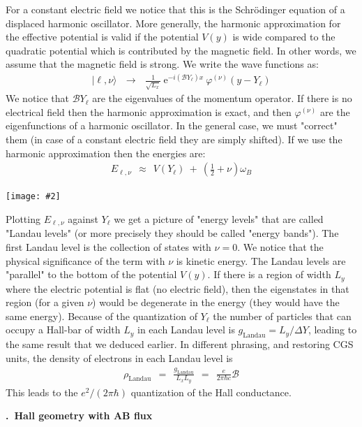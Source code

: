 \documentclass[onecolumn,fleqn, 11pt]{revtex4}
\newcommand{\eexp}{\mathrm{e}^}
\newcommand{\putgraph}[2][0.30\hsize]{\texttt{[image: \#2]}}
\newcommand{\beq}{\begin{eqnarray}}
\newcommand{\eeq}{\end{eqnarray}}
\renewcommand{\thesubsection}{\arabic{subsection}}
\renewcommand{\thesubsubsection}{\arabic{subsubsection}}
\newcommand{\sheadC}[1]
{
\addtocounter{subsubsection}{1}
\vspace{5mm}
{\bf \thesubsection.\thesubsubsection \ #1}  
\nopagebreak
\phantomsection
}
\begin{document}
For a constant electric field we notice that this 
is the Schr\"{o}dinger equation of a displaced 
harmonic oscillator. More generally, the harmonic 
approximation for the effective potential is 
valid if the potential ${V(y)}$ is wide compared 
to the quadratic potential which is contributed 
by the magnetic field. In other words, we assume that 
the magnetic field is strong. We write the wave functions as:
\beq
|\ell,\nu \rangle 
\ \ \ \rightarrow \ \ \ 
\frac{1}{\sqrt{L_x}} \  
\eexp{-i (\mathcal{B}Y_{\ell}) x } \  
\varphi^{(\nu)}(y-Y_{\ell}) 
\eeq
We notice that ${\mathcal{B}Y_{\ell}}$ are 
the eigenvalues of the momentum operator. 
If there is no electrical field then 
the harmonic approximation is exact, 
and then ${\varphi^{(\nu)}}$ are the 
eigenfunctions of a harmonic oscillator. 
In the general case, we must "correct" them
(in case of a constant electric field 
they are simply shifted). 
If we use the harmonic approximation 
then the energies are:
\beq
E_{\ell,\nu} \ \ \approx \ \ V( Y_{\ell} ) \ + \ \left( \frac{1}{2} + \nu \right) \omega_B 
\eeq




\begin{center}
\putgraph[0.6\hsize]{LandauLevels} 
\end{center}


Plotting $E_{\ell,\nu}$ against $Y_{\ell}$ 
we get a picture of "energy levels" that 
are called "Landau levels" (or more precisely they 
should be called "energy bands"). 
The first Landau level is the collection of states with ${\nu=0}$. 
We notice that the physical significance of the term 
with ${\nu}$ is kinetic energy. The Landau levels 
are "parallel" to the bottom of the potential ${V(y)}$. 
If there is a region of width ${L_y}$ where the electric potential 
is flat (no electric field), then the eigenstates 
in that region (for a given ${\nu}$) would be degenerate 
in the energy (they would have the same energy). 
Because of the quantization of $Y_{\ell}$  
the number of particles that can occupy a Hall-bar of 
width ${ L_y }$ in each Landau level 
is $g_{\text{Landau}}=L_y/\Delta Y$, 
leading to the same result that we deduced earlier.   
In different phrasing, and restoring CGS units, 
the density of electrons in each Landau level is 
\beq
\rho_{\text{Landau}} \ \ = \ \ \frac{g_{\text{Landau}}}{L_xL_y}
\ \ = \ \ \frac{e}{2\pi\hbar c}\mathcal{B} 
\eeq
This leads to the $e^2/(2\pi\hbar)$ quantization of the Hall conductance. 


\sheadC{Hall geometry with AB flux}
\end{document}
